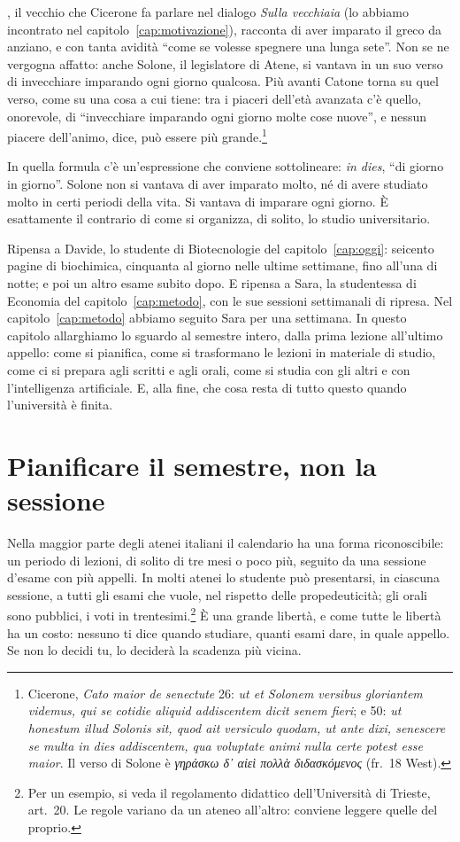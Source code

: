 , il vecchio che Cicerone fa parlare
nel dialogo \emph{Sulla vecchiaia} (lo abbiamo incontrato nel
capitolo~\ref{cap:motivazione}), racconta di aver imparato il greco da
anziano, e con tanta avidità
\enquote{come se volesse spegnere una lunga sete}. Non se ne vergogna
affatto: anche Solone, il legislatore di Atene, si vantava in un suo
verso di invecchiare imparando ogni giorno qualcosa. Più avanti Catone
torna su quel verso, come su una cosa a cui tiene: tra i piaceri
dell'età avanzata c'è quello, onorevole, di \enquote{invecchiare
imparando ogni giorno molte cose nuove}, e nessun piacere dell'animo,
dice, può essere più grande.\footnote{Cicerone, \emph{Cato maior de
senectute} 26: \emph{ut et Solonem versibus gloriantem videmus, qui se
cotidie aliquid addiscentem dicit senem fieri}; e 50: \emph{ut
honestum illud Solonis sit, quod ait versiculo quodam, ut ante dixi,
senescere se multa in dies addiscentem, qua voluptate animi nulla
certe potest esse maior}. Il verso di Solone è
\emph{γηράσκω δ᾽ αἰεὶ πολλὰ διδασκόμενος} (fr.~18
West).}

In quella formula c'è un'espressione che conviene sottolineare:
\emph{in dies}, \enquote{di giorno in giorno}. Solone non si vantava di
aver imparato molto, né di avere studiato molto in certi periodi della
vita. Si vantava di imparare ogni giorno. È esattamente il contrario di
come si organizza, di solito, lo studio universitario.

Ripensa a Davide, lo studente di Biotecnologie del
capitolo~\ref{cap:oggi}: seicento pagine di biochimica, cinquanta al
giorno nelle ultime settimane, fino all'una di notte; e poi un altro
esame subito dopo. E ripensa a Sara, la studentessa di Economia del
capitolo~\ref{cap:metodo}, con le sue sessioni settimanali di ripresa.
Nel capitolo~\ref{cap:metodo} abbiamo seguito Sara per una settimana.
In questo capitolo allarghiamo lo sguardo al semestre intero, dalla
prima lezione all'ultimo appello: come si pianifica, come si
trasformano le lezioni in materiale di studio, come ci si prepara agli
scritti e agli orali, come si studia con gli altri e con
l'intelligenza artificiale. E, alla fine, che cosa resta di tutto
questo quando l'università è finita.

\section{Pianificare il semestre, non la sessione}

Nella maggior parte degli atenei italiani il calendario ha una forma
riconoscibile: un periodo di lezioni, di solito di tre mesi o poco più,
seguito da una sessione d'esame con più appelli. In molti atenei lo
studente può presentarsi, in ciascuna sessione, a tutti gli esami che
vuole, nel rispetto delle propedeuticità; gli orali sono pubblici, i
voti in trentesimi.\footnote{Per un esempio, si veda il regolamento
didattico dell'Università di Trieste, art.~20. Le regole variano da un
ateneo all'altro: conviene leggere quelle del proprio.} È una grande
libertà, e come tutte le libertà ha un costo: nessuno ti dice quando
studiare, quanti esami dare, in quale appello. Se non lo decidi tu, lo
deciderà la scadenza più vicina.

